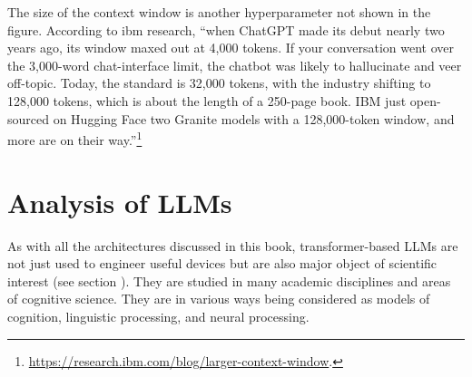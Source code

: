 The size of the context window is another hyperparameter not shown in the figure. According to ibm research, ``when ChatGPT made its debut nearly two years ago, its window maxed out at 4,000 tokens. If your conversation went over the 3,000-word chat-interface limit, the chatbot was likely to hallucinate and veer off-topic. Today, the standard is 32,000 tokens, with the industry shifting to 128,000 tokens, which is about the length of a 250-page book. IBM just open-sourced on Hugging Face two Granite models with a 128,000-token window, and more are on their way.''\footnote{\url{https://research.ibm.com/blog/larger-context-window}.}



%
%
% 
%
%
%
%

\section{Analysis of LLMs}

As with all the architectures discussed in this book, transformer-based LLMs are not just used to engineer useful devices but are also major object of scientific interest (see section ). They are studied in many academic disciplines and areas of cognitive science. They are in various ways being considered as models of cognition, linguistic processing, and neural processing. 

